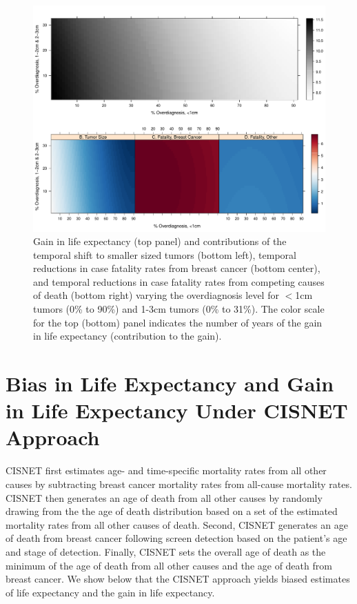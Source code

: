 \documentclass[11pt,letterpaper]{article}
\theoremstyle{plain}
\begin{document}
\begin{figure}[h]
\begin{center}
\includegraphics[scale=0.56]{appendix_figure2}
\caption{Gain in life expectancy (top panel) and
  contributions of the temporal shift to smaller sized tumors (bottom
  left), temporal reductions in case fatality rates from breast cancer
  (bottom center), and temporal reductions in case fatality rates from
  competing causes of death (bottom right) varying the overdiagnosis
  level for $<$1cm tumors (0\% to 90\%) and 1-3cm tumors (0\% to
  31\%).  The color scale for the top (bottom) panel indicates the
number of years of the gain in life expectancy (contribution to the gain).}
\label{fig:figure2}
\end{center}
\end{figure}

\newpage
\section{Bias in Life Expectancy and Gain in
  Life Expectancy Under CISNET Approach}
 CISNET first estimates age- and time-specific mortality
rates from all other causes by subtracting breast cancer mortality
rates from all-cause mortality rates.  CISNET then generates an age of
death from all other causes by randomly drawing from the the age of
death distribution based on a set of the estimated mortality rates
from all other causes of death.  Second, CISNET generates an age of
death from breast cancer following screen detection based on the
patient's age and stage of detection.  Finally, CISNET sets the
overall age of death as the minimum of the age of death from all other
causes and the age of death from breast cancer.  We show below that the
CISNET approach yields biased estimates of life expectancy and the
gain in life expectancy.
\end{document}
